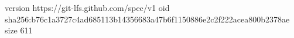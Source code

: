 version https://git-lfs.github.com/spec/v1
oid sha256:b76c1a3727c4ad685113b14356683a47b6f1150886e2c2f222acea800b2378ae
size 611
